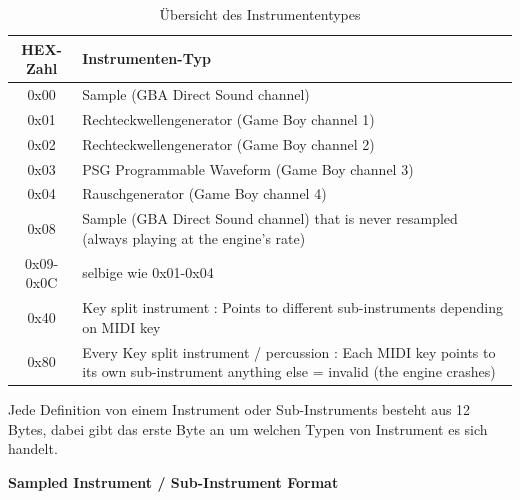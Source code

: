 \documentclass[11pt,a4paper]{scrartcl}
\begin{document}
\begin{table}[h]
    \centering
    \begin{tabular}{ c | p{15cm} }
        \textbf{HEX-Zahl} & \textbf{Instrumenten-Typ} \\
        \hline
        0x00 & Sample (GBA Direct Sound channel) \\
        \hline
        0x01 & Rechteckwellengenerator (Game Boy channel 1) \\
        \hline
        0x02 & Rechteckwellengenerator (Game Boy channel 2) \\
        \hline
        0x03 & PSG Programmable Waveform (Game Boy channel 3) \\
        \hline
        0x04 & Rauschgenerator (Game Boy channel 4) \\
        \hline
        0x08 & Sample (GBA Direct Sound channel) that is never resampled (always playing at the engine's rate) \\
				\hline
        0x09-0x0C & selbige wie 0x01-0x04\\
				\hline
        0x40 & Key split instrument  : Points to different sub-instruments depending on MIDI key \\
				\hline
        0x80 & Every Key split instrument / percussion : Each MIDI key points to its own sub-instrument anything else = invalid (the engine crashes) \\
    \end{tabular}
    \caption{\"{U}bersicht des Instrumententypes}
    \label{table:InstrumentenTyp}
\end{table}

Jede Definition von einem Instrument oder Sub-Instruments besteht aus 12 Bytes, dabei gibt das erste Byte an um welchen Typen von Instrument es sich handelt.

\vspace{15pt}
\textbf{{\large Sampled Instrument / Sub-Instrument Format}}
\end{document}
